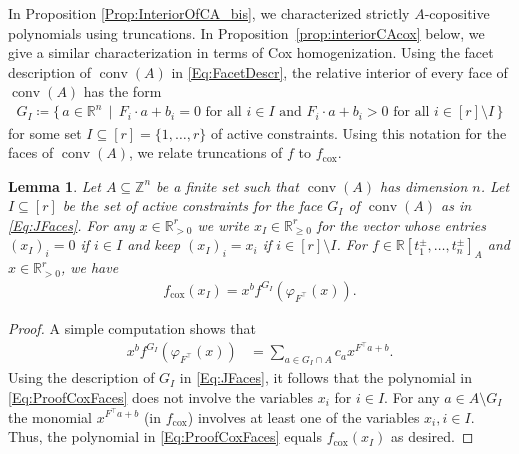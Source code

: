 \documentclass[a4paper,11pt]{amsart}
\newtheorem{lemma}[theorem]{Lemma}
\theoremstyle{definition}
\DeclareMathOperator{\conv}{conv}
\newcommand{\RR}{\mathbb{R}}
\newcommand{\cox}{\mathrm{cox}}
\begin{document}
In Proposition \ref{Prop:InteriorOfCA_bis}, we  characterized strictly $A$-copositive polynomials using truncations. In Proposition~\ref{prop:interiorCAcox} below, we give a similar characterization in terms of Cox homogenization.
Using the facet description of $\conv(A)$ in \eqref{Eq:FacetDescr}, the relative interior of every face of $\conv(A)$ has the form
\begin{align}
\label{Eq:JFaces}
 G_I \coloneqq \{ \, a \in \RR^n \, \mid \, F_i \cdot a + b_i = 0 \text{ for all } i \in I \text{ and }  F_i \cdot a + b_i > 0 \text{ for all } i \in [r] \setminus I \, \}
 \end{align}
for some set $I \subseteq [r]=\{1,\ldots,r\}$ of active constraints. Using this notation for the faces of $\conv(A)$, we relate truncations of $f$ to $f_\cox$.

\begin{lemma}
\label{lem:coxtruncation}
Let $A \subseteq \mathbb{Z}^n$ be a finite set such that $\conv(A)$ has dimension $n$.
Let $I \subseteq [r]$ be the set of active constraints for the face $G_I$ of $\conv(A)$ as in \eqref{Eq:JFaces}.
For any $x \in \RR^r_{>0}$ we write $x_I \in \mathbb{R}^r_{\geq0}$ for the vector whose entries $(x_I)_i = 0$ if $i \in I$ and keep  $(x_I)_i = x_i$ if $i \in [r] \setminus I$.
For $f \in \RR[t_1^\pm , \dots, t_n^\pm]_A$ and $x\in \RR^r_{>0}$, we have
\begin{align*}
        f_{\cox}(x_I)=x^bf^{G_I}(\varphi_{F^\top}(x)).
    \end{align*}
\end{lemma}
\begin{proof}
A simple computation shows that
\begin{align}
\label{Eq:ProofCoxFaces}
        x^b f^{G_I}(\varphi_{F^\top}(x))&=\sum_{a\in G_I \cap A}c_a x^{F^\top a+b}.
    \end{align}
    Using the description of $G_I$ in \eqref{Eq:JFaces}, it follows that the polynomial in \eqref{Eq:ProofCoxFaces} does not involve the variables $x_i$ for $i\in I$. For any $a \in A \setminus G_I$ the monomial $x^{F^\top a+b}$ (in $f_\cox$) involves at least one of the variables $x_i, i\in I$. Thus, the polynomial in \eqref{Eq:ProofCoxFaces} equals $f_{\cox}(x_I)$  as desired.
\end{proof}
\end{document}
